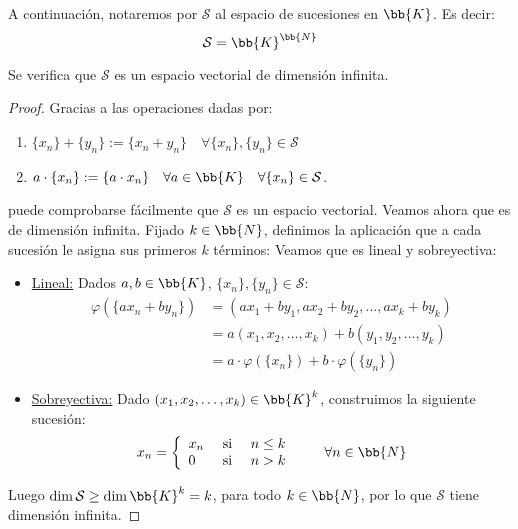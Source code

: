 \begin{notacion}
    A continuación, notaremos por $\mathcal{S}$ al espacio de sucesiones en $\bb{K}$. Es decir:
    \begin{equation*}
        \mathcal{S} = \bb{K}^\bb{N}
    \end{equation*}
\end{notacion}
\begin{prop}\label{prop:S_dim_infinita}
    Se verifica que $\mathcal{S}$ es un espacio vectorial de dimensión infinita.
\end{prop}
\begin{proof}
    Gracias a las operaciones dadas por:
    \begin{enumerate}
        \item $\{x_n\} + \{y_n\} := \{x_n + y_n\}\quad \forall \{x_n\}, \{y_n\} \in \mathcal{S}$
        \item $a\cdot \{x_n\} := \{a\cdot x_n\}\quad \forall a\in\bb{K}\quad \forall \{x_n\}\in\mathcal{S}$.
    \end{enumerate}
    puede comprobarse fácilmente que $\mathcal{S}$ es un espacio vectorial. Veamos ahora que es de dimensión infinita. Fijado $k\in \bb{N}$, definimos la aplicación que a cada sucesión le asigna sus primeros $k$ términos:
    Veamos que es lineal y sobreyectiva:
    \begin{itemize}
        \item \ul{Lineal:} Dados $a,b \in \bb{K}$, $\{x_n\}, \{y_n\} \in \mathcal{S}$:
        \begin{align*}
            \varphi(\{ax_n + by_n\}) &= (ax_1 + by_1, ax_2 + by_2, \ldots, ax_k + by_k) \\
            &= a(x_1, x_2, \ldots, x_k) + b (y_1, y_2, \ldots, y_k) \\
            &= a\cdot \varphi(\{x_n\}) + b\cdot \varphi(\{y_n\})
        \end{align*}
        \item \ul{Sobreyectiva:} Dado $(x_1, x_2, \ldots, x_k) \in \bb{K}^k$, construimos la siguiente sucesión:
        \begin{equation*}
            x_n = \left\{\begin{array}{lcl}
                x_n & \text{\ si\ } & n\leq k \\
                0 & \text{\ si\ } & n> k
            \end{array} \right. \qquad \forall n \in \bb{N}
        \end{equation*}
    \end{itemize}
    Luego $\dim \mathcal{S} \geq \dim \bb{K}^k = k$, para todo $k\in \bb{N}$, por lo que $\mathcal{S}$ tiene dimensión infinita.
\end{proof}

